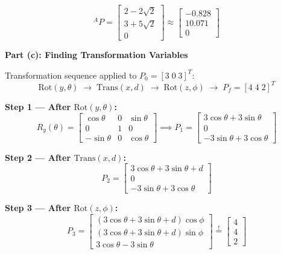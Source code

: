 \documentclass[12pt,a3paper]{article}
\begin{document}
\begin{enumerate}
\begin{tcolorbox}[enhanced,breakable,ansbox,colback=cB!4,colframe=cB,
  boxrule=0.8pt,arc=5pt,
  title={\textbf{Answer}},fonttitle=\bfseries\color{white},
  colbacktitle=cB]
\[
  \boxed{{}^AP = \begin{bmatrix}2 - 2\sqrt{2}\\[4pt] 3 + 5\sqrt{2}\\[4pt] 0\end{bmatrix}
  \approx \begin{bmatrix}-0.828\\10.071\\0\end{bmatrix}}
\]

\medskip
\textbf{Part (c): Finding Transformation Variables}

\medskip
Transformation sequence applied to $P_0 = [3\;0\;3]^T$:
\[
  \mathrm{Rot}(y,\theta) \;\longrightarrow\;
  \mathrm{Trans}(x,d) \;\longrightarrow\;
  \mathrm{Rot}(z,\phi) \;\longrightarrow\;
  P_f = [4\;4\;2]^T
\]

\textbf{Step 1 — After $\mathrm{Rot}(y,\theta)$:}
\[
  R_y(\theta) = \begin{bmatrix}
    \cos\theta & 0 & \sin\theta\\
    0 & 1 & 0\\
    -\sin\theta & 0 & \cos\theta
  \end{bmatrix}
  \implies
  P_1 = \begin{bmatrix}
    3\cos\theta + 3\sin\theta \\
    0 \\
    -3\sin\theta + 3\cos\theta
  \end{bmatrix}
\]

\textbf{Step 2 — After $\mathrm{Trans}(x,d)$:}
\[
  P_2 = \begin{bmatrix}
    3\cos\theta + 3\sin\theta + d \\ 0 \\ -3\sin\theta + 3\cos\theta
  \end{bmatrix}
\]

\textbf{Step 3 — After $\mathrm{Rot}(z,\phi)$:}
\[
  P_3 = \begin{bmatrix}
    (3\cos\theta + 3\sin\theta + d)\cos\phi \\
    (3\cos\theta + 3\sin\theta + d)\sin\phi \\
    3\cos\theta - 3\sin\theta
  \end{bmatrix}
  \stackrel{!}{=} \begin{bmatrix}4\\4\\2\end{bmatrix}
\]


\end{tcolorbox}
\end{enumerate}
\end{document}
